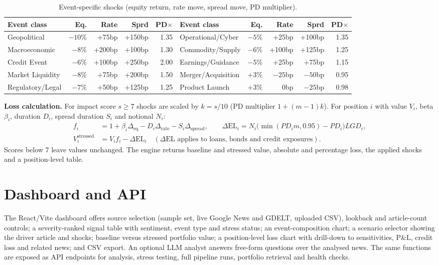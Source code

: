 \documentclass[11pt,a4paper]{article}
\begin{document}
\begin{table}[!htbp]
\centering\small
{\footnotesize\setlength{\tabcolsep}{3.2pt}\begin{tabular}{@{}lrrrr@{\hspace{0.5cm}}lrrrr@{}}
\toprule
\textbf{Event class} & \textbf{Eq.} & \textbf{Rate} & \textbf{Sprd} & \textbf{PD$\times$} & \textbf{Event class} & \textbf{Eq.} & \textbf{Rate} & \textbf{Sprd} & \textbf{PD$\times$}\\
\midrule
Geopolitical & $-10\%$ & +75bp & +150bp & 1.35 & Operational/Cyber & $-5\%$ & +25bp & +100bp & 1.35\\
Macroeconomic & $-8\%$ & +200bp & +100bp & 1.30 & Commodity/Supply & $-6\%$ & +100bp & +125bp & 1.25\\
Credit Event & $-6\%$ & +100bp & +250bp & 2.00 & Earnings/Guidance & $-5\%$ & +25bp & +75bp & 1.15\\
Market Liquidity & $-8\%$ & +75bp & +200bp & 1.50 & Merger/Acquisition & $+3\%$ & $-25$bp & $-50$bp & 0.95\\
Regulatory/Legal & $-7\%$ & +50bp & +125bp & 1.25 & Product Launch & $+3\%$ & 0bp & $-25$bp & 0.98\\
\bottomrule
\end{tabular}}
\caption{Event-specific shocks (equity return, rate move, spread move, PD multiplier).}
\end{table}

\textbf{Loss calculation.} For impact score $s\ge7$ shocks are scaled by $k=s/10$ (PD multiplier $1+(m-1)k$). For position $i$ with value $V_i$, beta $\beta_i$, duration $D_i$, spread duration $S_i$ and notional $N_i$:
\begin{align*}
f_i &= 1 + \beta_i\Delta_{\text{eq}} - D_i\Delta_{\text{rate}} - S_i\Delta_{\text{spread}}, \qquad
\Delta\text{EL}_i = N_i\bigl(\min(PD_i m,0.95)-PD_i\bigr)LGD_i,\\
V_i^{\text{stressed}} &= V_i f_i - \Delta\text{EL}_i \quad(\Delta\text{EL}\text{ applies to loans, bonds and credit exposures}).
\end{align*}
Scores below 7 leave values unchanged. The engine returns baseline and stressed value, absolute and percentage loss, the applied shocks and a position-level table.

\section{Dashboard and API}
The React/Vite dashboard offers source selection (sample set, live Google News and GDELT, uploaded CSV), lookback and article-count controls; a severity-ranked signal table with sentiment, event type and stress status; an event-composition chart; a scenario selector showing the driver article and shocks; baseline versus stressed portfolio value; a position-level loss chart with drill-down to sensitivities, P\&L, credit loss and related news; and CSV export. An optional LLM analyst answers free-form questions over the analysed news. The same functions are exposed as API endpoints for analysis, stress testing, full pipeline runs, portfolio retrieval and health checks.
\end{document}
